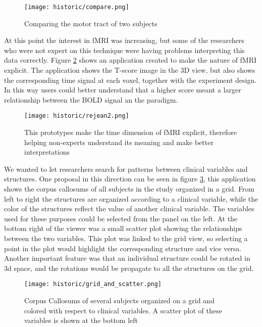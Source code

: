 \begin{figure}
\centering
\texttt{[image: historic/compare.png]} 
\caption{\label{fig_compare_1}Comparing the motor tract of two subjects}
\end{figure}

At this point the interest in fMRI was increasing, but some of the researchers who were not expert on this technique were having problems interpreting this data correctly. Figure \ref{fig_fmri_1} shows an application created to make the nature of fMRI explicit. The application shows the T-score image in the 3D view, but also shows the corresponding time signal at each voxel, together with the experiment design. In this way users could better understand that a higher score meant a larger relationship between the BOLD signal an the paradigm. 

\begin{figure}
\centering
\texttt{[image: historic/rejean2.png]} 
\caption{\label{fig_fmri_1}This prototypes make the time dimension of fMRI explicit, therefore helping non-experts understand its meaning and make better interpretations}
\end{figure}

We wanted to let researchers search for patterns between clinical variables and structures. One proposal in this direction can be seen in figure \ref{fig_grid}, this application shows the corpus callosums of all subjects in the study organized in a grid. From left to right the structures are organized according to a clinical variable, while the color of the structures reflect the value of another clinical variable. The variables used for these purposes could be selected from the panel on the left. At the bottom right of the viewer was a small scatter plot showing the relationships between the two variables. This plot was linked to the grid view, so selecting a point in the plot would highlight the corresponding structure and vice versa. Another important feature was that an individual structure could be rotated in 3d space, and the rotations would be propagate to all the structures on the grid.

\begin{figure}
\centering
\texttt{[image: historic/grid\_and\_scatter.png]} 
\caption{\label{fig_grid}Corpus Callosums of several subjects organized on a grid and colored with respect to clinical variables.
A scatter plot of these variables is shown at the bottom left}
\end{figure}

